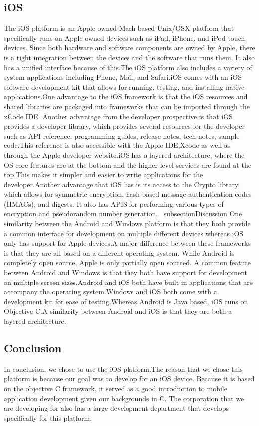 \documentclass[onecolumn, draftclsnofoot,10pt, compsoc]{IEEEtran}
\begin{document}
        \subsection{iOS}    
        The iOS platform is an Apple owned Mach based Unix/OSX platform that specifically runs on Apple owned devices such as iPad, iPhone, and iPod touch devices. Since both hardware and software components are owned by Apple, there is a tight integration between the devices and the software that runs them. It also has a unified interface because of this.The iOS platform also includes a variety of system applications including Phone, Mail, and Safari.iOS comes with an iOS software development kit that allows for running, testing, and installing native applications.One advantage to the iOS framework is that the iOS resources and shared libraries are packaged into frameworks that can be imported through the xCode IDE. Another advantage from the developer prospective is that iOS provides a developer library, which provides several resources for the developer such as API reference, programming guides, release notes, tech notes, sample code.This reference is also accessible with the Apple IDE,Xcode as well as through the Apple developer website.iOS has a layered architecture, where the OS core features are at the bottom and the higher level services are found at the top.This makes it simpler and easier to write applications for the developer.Another advantage that iOS has is its access to the Crypto library, which allows for symmetric encryption, hash-based message authentication codes (HMACs), and digests. It also has APIS for performing various types of encryption and pseudorandom number generation.\cite{iOS}
   \ subsection{Discussion} 
    One similarity between the Android and Windows platform is that they both provide a common interface for development on multiple different devices whereas iOS only has support for Apple devices.A major difference between these frameworks is that they are all based on a different operating system. While Android is completely open source, Apple is only partially open sourced. A common feature between Android and Windows is that they both have support for development on multiple screen sizes.Android and iOS both have built in applications that are accompany the operating system.Windows and iOS both come with a development kit for ease of testing.Whereas Android is Java based, iOS runs on Objective C.A similarity between Android and iOS is that they are both a layered architecture.
   \subsection{Conclusion}
     In conclusion, we chose to use the iOS platform.The reason that we chose this platform is because our goal was to develop for an iOS device. Because it is based on the objective C framework, it served as a good introduction to mobile application development given our backgrounds in C. The corporation that we are developing for also has a large development department that develops specifically for this platform.
\end{document}
